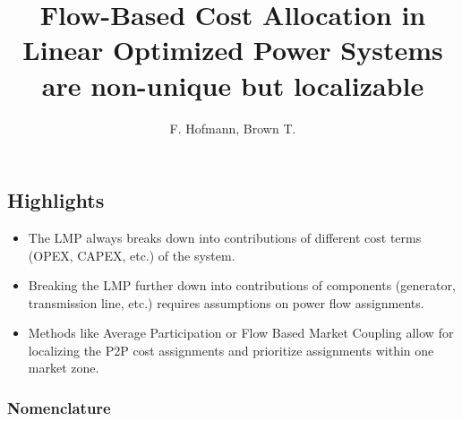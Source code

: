 \documentclass[11pt,twocolumn]{article}
\begin{document}
\title{Flow-Based Cost Allocation in Linear Optimized Power Systems are non-unique but localizable}
\author{F. Hofmann, Brown T.}

\maketitle

\begin{abstract}
\end{abstract}


\subsection*{Highlights}
\begin{itemize}
 \item The LMP always breaks down into contributions of different cost terms (OPEX, CAPEX, etc.) of the system.
 \item Breaking the LMP further down into contributions of components (generator, transmission line, etc.) requires assumptions on power flow assignments.
 \item Methods like Average Participation or Flow Based Market Coupling allow for localizing the P2P cost assignments and prioritize assignments within one market zone.
\end{itemize}





\subsubsection*{Nomenclature}
\end{document}
